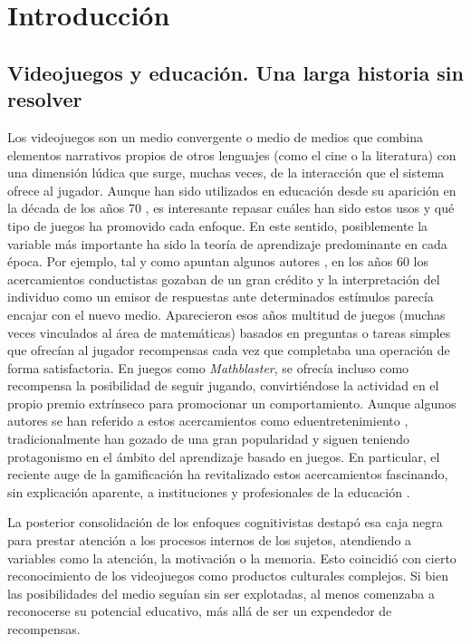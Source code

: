 \documentclass[spanish]{textolivre}
\begin{document}
\section{Introducción}
\subsection{Videojuegos y educación. Una larga historia sin resolver}
Los videojuegos son un medio convergente o medio de medios que combina elementos narrativos propios de otros lenguajes (como el cine o la literatura) con una dimensión lúdica que surge, muchas veces, de la interacción que el sistema ofrece al jugador. Aunque han sido utilizados en educación desde su aparición en la década de los años 70 \cite{jones2017}, es interesante repasar cuáles han sido estos usos y qué tipo de juegos ha promovido cada enfoque. En este sentido, posiblemente la variable más importante ha sido la teoría de aprendizaje predominante en cada época. Por ejemplo, tal y como apuntan algunos autores \cite{facer2003}, en los años 60 los acercamientos conductistas gozaban de un gran crédito y la interpretación del individuo como un emisor de respuestas ante determinados estímulos parecía encajar con el nuevo medio. Aparecieron esos años multitud de juegos (muchas veces vinculados al área de matemáticas) basados en preguntas o tareas simples que ofrecían al jugador recompensas cada vez que completaba una operación de forma satisfactoria. En juegos como \emph{Mathblaster}, se ofrecía incluso como recompensa la posibilidad de seguir jugando, convirtiéndose la actividad en el propio premio extrínseco para promocionar un comportamiento. Aunque algunos autores se han referido a estos acercamientos como eduentretenimiento \cite{egenfeldt2021understanding}, tradicionalmente han gozado de una gran popularidad y siguen teniendo protagonismo en el ámbito del aprendizaje basado en juegos. En particular, el reciente auge de la gamificación ha revitalizado estos acercamientos fascinando, sin explicación aparente, a instituciones y profesionales de la educación \cite{oceja_business_2022}.

La posterior consolidación de los enfoques cognitivistas \cite{egenfeldt2021understanding} destapó esa caja negra para prestar atención a los procesos internos de los sujetos, atendiendo a variables como la atención, la motivación o la memoria. Esto coincidió con cierto reconocimiento de los videojuegos como productos culturales complejos. Si bien las posibilidades del medio seguían sin ser explotadas, al menos comenzaba a reconocerse su potencial educativo, más allá de ser un expendedor de recompensas.
\end{document}
